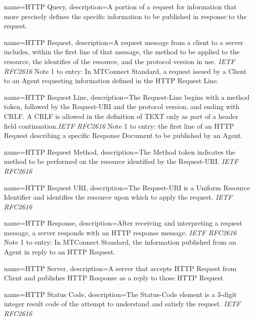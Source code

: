{
    name={HTTP Query},
	description={A portion of a request for information that more precisely defines the specific information to be published in response to the request. }
}

{
    name={HTTP Request},
	description={A request message from a client to a server includes, within the first line of that message, the method to be applied to the resource, the identifier of the resource, and the protocol version in use. \textit{IETF RFC2616}
Note 1 to entry: In MTConnect Standard, a request issued by a \gls{Client} to an \gls{Agent} requesting information defined in the \gls{HTTP Request Line}.}
}

{
    name={HTTP Request Line},
	description={The Request-Line begins with a method token, followed by the Request-URI and the protocol version, and ending with CRLF. A CRLF is allowed in the definition of TEXT only as part of a header field continuation.\textit{IETF RFC2616}
Note 1 to entry: the first line of an \gls{HTTP Request} describing a specific \gls{Response Document} to be published by an \gls{Agent}.}
}

{
    name={HTTP Request Method},
	description={The Method  token indicates the method to be performed on the resource identified by the Request-URI. \textit{IETF RFC2616}}
}

{
    name={HTTP Request URI},
	description={The Request-URI is a Uniform Resource Identifier and identifies the resource upon which to apply the request. \textit{IETF RFC2616}}
}

{
    name={HTTP Response},
	description={After receiving and interpreting a request message, a server responds with an HTTP response message. \textit{IETF RFC2616}
Note 1 to entry: In MTConnect Standard, the information published from an \gls{Agent} in reply to an \gls{HTTP Request}. }
}

{
    name={HTTP Server},
	description={A server that accepts \gls{HTTP Request} from \gls{Client} and publishes \gls{HTTP Response} as a reply to those \gls{HTTP Request}.}
}

{
    name={HTTP Status Code},
	description={The Status-Code element is a 3-digit integer result code of the attempt to understand and satisfy the request.  \textit{IETF RFC2616}}
}


